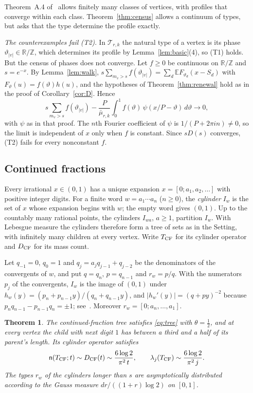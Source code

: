 \documentclass[11pt]{article}
\newtheorem{theorem}{Theorem}[section]
\theoremstyle{definition}
\theoremstyle{remark}
\newcommand{\Z}{\mathbb Z}
\newcommand{\R}{\mathbb R}
\newcommand{\cyl}{\mathcal T}
\newcommand{\ncount}{\mathsf n}
\newcommand{\E}{\mathbb E}
\begin{document}
Theorem~A.4 of~\cite{K26} allows finitely many classes of vertices, with
profiles that converge within each class. Theorem~\ref{thm:census}
allows a continuum of types, but asks that the type determine the
profile exactly.

\emph{The counterexamples fail (T2).} In $\cyl_{r,k}$ the natural type of
a vertex is its phase $\vartheta_{|v|}\in\R/\Z$, which determines its
profile by Lemma~\ref{lem:basic}(4), so (T1) holds. But the census of
phases does not converge. Let $f\ge0$ be continuous on $\R/\Z$ and
$s=e^{-x}$. By Lemma~\ref{lem:walk},
$s\sum_{m_v>s}f(\vartheta_{|v|})=\sum_d\E F_{\vartheta_d}(x-S_d)$ with
$F_\vartheta(u)=f(\vartheta)h(u)$, and the hypotheses of
Theorem~\ref{thm:renewal} hold as in the proof of
Corollary~\ref{cor:D}. Hence
\[
 s\sum_{m_v>s}f(\vartheta_{|v|})
 -\frac P{\bar\mu_{r,k}}\int_0^1f(\vartheta)\,\psi(x/P-\vartheta)\,d\vartheta
 \longrightarrow0,
\]
with $\psi$ as in that proof. The $n$th Fourier coefficient of $\psi$ is
$1/(P+2\pi in)\ne0$, so the limit is independent of $x$ only when $f$ is
constant. Since $sD(s)$ converges, (T2) fails for every nonconstant $f$.

\subsection{Continued fractions}
Every irrational $x\in(0,1)$ has a unique expansion
$x=[0;a_1,a_2,\ldots]$ with positive integer digits. For a finite word
$w=a_1\cdots a_n$ ($n\ge0$), the \emph{cylinder} $I_w$ is the set of
$x$ whose expansion begins with $w$; the empty word gives $(0,1)$. Up to
the countably many rational points, the cylinders $I_{wa}$, $a\ge1$,
partition $I_w$. With Lebesgue measure the cylinders therefore form a
tree of sets as in the Setting, with infinitely many children at every
vertex. Write $T_{\rm CF}$ for its cylinder operator and $D_{\rm CF}$ for
its mass count.

Let $q_{-1}=0$, $q_0=1$ and $q_j=a_jq_{j-1}+q_{j-2}$ be the denominators
of the convergents of $w$, and put $q=q_n$, $p=q_{n-1}$ and $r_w=p/q$.
With the numerators $p_j$ of the convergents, $I_w$ is the image of
$(0,1)$ under $h_w(y)=(p_n+p_{n-1}y)/(q_n+q_{n-1}y)$, and
$|h_w'(y)|=(q+py)^{-2}$ because $p_nq_{n-1}-p_{n-1}q_n=\pm1$;
see~\cite[Chapter~3]{EW}. Moreover $r_w=[0;a_n,\ldots,a_1]$.

\begin{theorem}\label{thm:cf}
The continued-fraction tree satisfies \eqref{eq:tree} with $\theta=\frac12$,
and at every vertex the child with next digit $1$ has between a third
and a half of its parent's length. Its cylinder operator satisfies
\[
 \ncount(T_{\rm CF};t)\sim D_{\rm CF}(t)\sim\frac{6\log2}{\pi^2\,t},
 \qquad
 \lambda_j(T_{\rm CF})\sim\frac{6\log2}{\pi^2\,j}.
\]
The types $r_w$ of the cylinders longer than $s$ are asymptotically
distributed according to the Gauss measure $dr/((1+r)\log2)$ on $[0,1]$.
\end{theorem}
\end{document}
